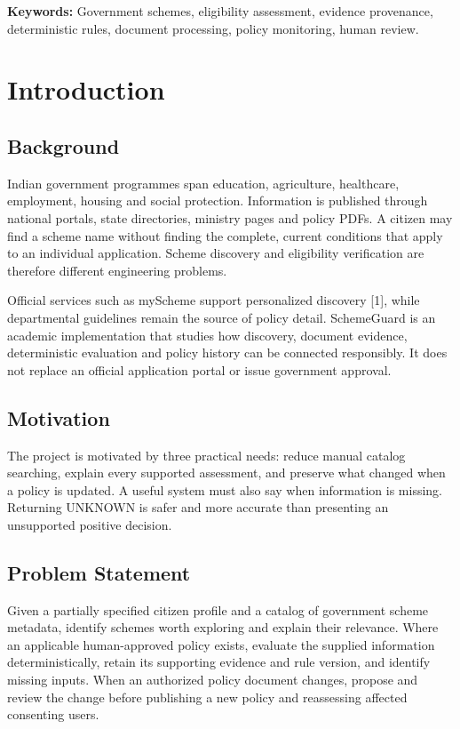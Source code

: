 \documentclass[12pt,a4paper,twoside]{report}
\begin{document}
\noindent\textbf{Keywords:} Government schemes, eligibility assessment, evidence provenance, deterministic rules, document processing, policy monitoring, human review.

\tableofcontents
\listoffigures
\listoftables
\clearpage
{}


\clearpage\chapter{Introduction}

\section{Background}

Indian government programmes span education, agriculture, healthcare, employment, housing and social protection. Information is published through national portals, state directories, ministry pages and policy PDFs. A citizen may find a scheme name without finding the complete, current conditions that apply to an individual application. Scheme discovery and eligibility verification are therefore different engineering problems.

Official services such as myScheme support personalized discovery [1], while departmental guidelines remain the source of policy detail. SchemeGuard is an academic implementation that studies how discovery, document evidence, deterministic evaluation and policy history can be connected responsibly. It does not replace an official application portal or issue government approval.

\section{Motivation}

The project is motivated by three practical needs: reduce manual catalog searching, explain every supported assessment, and preserve what changed when a policy is updated. A useful system must also say when information is missing. Returning UNKNOWN is safer and more accurate than presenting an unsupported positive decision.

\section{Problem Statement}

Given a partially specified citizen profile and a catalog of government scheme metadata, identify schemes worth exploring and explain their relevance. Where an applicable human-approved policy exists, evaluate the supplied information deterministically, retain its supporting evidence and rule version, and identify missing inputs. When an authorized policy document changes, propose and review the change before publishing a new policy and reassessing affected consenting users.
\end{document}
